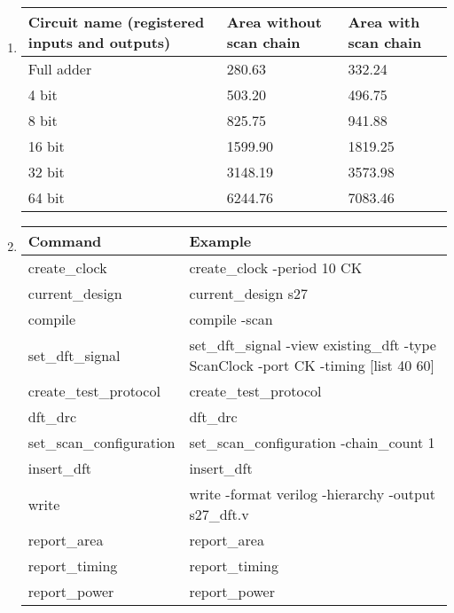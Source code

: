 \documentclass[a4paper,12pt]{article}
\begin{document}
\begin{enumerate}
        \item \begin{tabularx}{\textwidth}{|X|X|X|}
                \hline
                Circuit name (registered inputs and outputs) & Area without scan chain & Area with scan chain \\ \hline
                Full adder & 280.63 & 332.24\\ \hline
                4 bit & 503.20 & 496.75\\ \hline
                8 bit & 825.75 & 941.88\\ \hline
                16 bit & 1599.90 & 1819.25\\ \hline
                32 bit & 3148.19 & 3573.98\\ \hline
                64 bit & 6244.76 & 7083.46\\ \hline
            \end{tabularx}

        \item \begin{tabularx}{\textwidth}{|X|X|}
                \hline
                Command & Example \\ \hline
                create\_clock & create\_clock -period 10 CK \\ \hline
                current\_design & current\_design s27 \\ \hline
                compile & compile -scan \\ \hline
                set\_dft\_signal & set\_dft\_signal -view existing\_dft -type ScanClock -port CK -timing [list 40 60] \\ \hline
                create\_test\_protocol & create\_test\_protocol \\ \hline
                dft\_drc & dft\_drc \\ \hline
                set\_scan\_configuration & set\_scan\_configuration -chain\_count 1 \\ \hline
                insert\_dft & insert\_dft \\ \hline
                write & write -format verilog -hierarchy -output s27\_dft.v \\ \hline
                report\_area & report\_area \\ \hline
                report\_timing & report\_timing \\ \hline
                report\_power & report\_power \\ \hline
            \end{tabularx}

    \end{enumerate}
\end{document}

